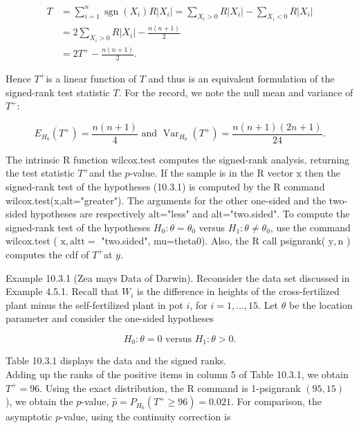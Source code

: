 \begin{align*}
T & =\sum_{i=1}^{n} \operatorname{sgn}\left(X_{i}\right) R\left|X_{i}\right|=\sum_{X_{i}>0} R\left|X_{i}\right|-\sum_{X_{i}<0} R\left|X_{i}\right| \\
& =2 \sum_{X_{i}>0} R\left|X_{i}\right|-\frac{n(n+1)}{2} \\
& =2 T^{+}-\frac{n(n+1)}{2} . \tag{10.3.11}
\end{align*}


Hence $T^{+}$is a linear function of $T$ and thus is an equivalent formulation of the signed-rank test statistic $T$. For the record, we note the null mean and variance of $T^{+}$:


\begin{equation*}
E_{H_{0}}\left(T^{+}\right)=\frac{n(n+1)}{4} \text { and } \operatorname{Var}_{H_{0}}\left(T^{+}\right)=\frac{n(n+1)(2 n+1)}{24} . \tag{10.3.12}
\end{equation*}


The intrinsic R function wilcox.test computes the signed-rank analysis, returning the test statistic $T^{+}$and the $p$-value. If the sample is in the R vector x then the signed-rank test of the hypotheses (10.3.1) is computed by the R command wilcox.test(x,alt="greater"). The arguments for the other one-sided and the two-sided hypotheses are respectively alt="less" and alt="two.sided". To compute the signed-rank test of the hypotheses $H_{0}: \theta=\theta_{0}$ versus $H_{1}: \theta \neq \theta_{0}$, use the command wilcox.test ( $\mathrm{x}, \mathrm{alt} \mathrm{t}=$ "two.sided", mu=theta0). Also, the R call psignrank( $\mathrm{y}, \mathrm{n}$ ) computes the cdf of $T^{+}$at $y$.

Example 10.3.1 (Zea mays Data of Darwin). Reconsider the data set discussed in Example 4.5.1. Recall that $W_{i}$ is the difference in heights of the cross-fertilized plant minus the self-fertilized plant in pot $i$, for $i=1, \ldots, 15$. Let $\theta$ be the location parameter and consider the one-sided hypotheses


\begin{equation*}
H_{0}: \theta=0 \text { versus } H_{1}: \theta>0 . \tag{10.3.13}
\end{equation*}


Table 10.3.1 displays the data and the signed ranks.\\
Adding up the ranks of the positive items in column 5 of Table 10.3.1, we obtain $T^{+}=96$. Using the exact distribution, the R command is 1-psignrank $(95,15)$ ), we obtain the $p$-value, $\widehat{p}=P_{H_{0}}\left(T^{+} \geq 96\right)=0.021$. For comparison, the asymptotic $p$-value, using the continuity correction is

